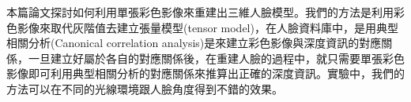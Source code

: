 本篇論文探討如何利用單張彩色影像來重建出三維人臉模型。我們的方法是利用彩色影像來取代灰階值去建立張量模型(tensor model)，在人臉資料庫中，是用典型相關分析(Canonical correlation analysis)是來建立彩色影像與深度資訊的對應關係，一旦建立好屬於各自的對應關係後，在重建人臉的過程中，就只需要單張彩色影像即可利用典型相關分析的對應關係來推算出正確的深度資訊。實驗中，我們的方法可以在不同的光線環境跟人臉角度得到不錯的效果。